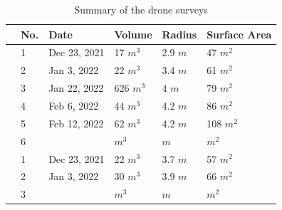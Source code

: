 \documentclass[tc, manuscript]{copernicus}
\begin{document}
\begin{table}
	\centering
	\caption{ Summary of the drone surveys}
	\label{tab:uav}
	\begin{tabular}{@{}|llllll|@{}}
		\toprule
		\textbf{}              & \textbf{No.} & \textbf{Date} & \textbf{Volume} & \textbf{Radius} & \textbf{Surface Area} \\ \midrule
		\multicolumn{1}{|l|}{\multirow{6}{*}{\rotatebox[origin=c]{90}{Traditional}}}
		                       & 1            & Dec 23, 2021  & 17 $m^{3}$     & 2.9 $m$
		                       & 47 $m^{2}$                                                                      \\
		\multicolumn{1}{|l|}{} & 2            & Jan 3, 2022  & 22 $m^{3}$     & 3.4 $m$
		                       & 61 $m^{2}$                                                                      \\
		\multicolumn{1}{|l|}{} & 3            & Jan 22, 2022   & 626 $m^{3}$     & 4 $m$
		                       & 79 $m^{2}$                                                                      \\
		\multicolumn{1}{|l|}{} & 4            & Feb 6, 2022  & 44 $m^{3}$     & 4.2 $m$
		                       & 86 $m^{2}$                                                                      \\
		\multicolumn{1}{|l|}{} & 5            & Feb 12, 2022  & 62 $m^{3}$     & 4.2 $m$
		                       & 108 $m^{2}$                                                                      \\
		\multicolumn{1}{|l|}{} & 6            & & $m^{3}$     & $m$
		                       & $m^{2}$
		\\\midrule
		\multicolumn{1}{|l|}{\multirow{3}{*}{\rotatebox[origin=c]{90}{Automatic}}}
		                       & 1            & Dec 23, 2021  & 22 $m^{3}$      & 3.7 $m$
		                       & 57 $m^{2}$                                                                       \\
		\multicolumn{1}{|l|}{} & 2            & Jan 3, 2022   & 30 $m^{3}$      & 3.9 $m$
		                       & 66 $m^{2}$                                                                       \\
		\multicolumn{1}{|l|}{} & 3            &               &    $m^{3}$      &     $m$
		                       &    $m^{2}$                                                                       \\
		\bottomrule
	\end{tabular}

\end{table}
\end{document}
